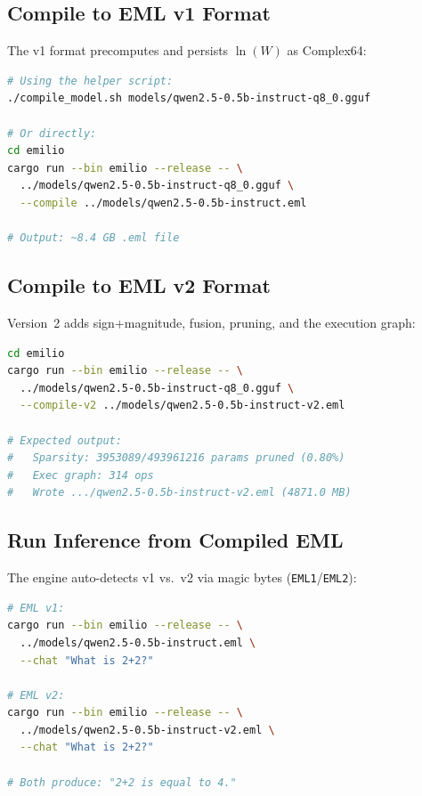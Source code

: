 \documentclass[acmsmall,nonacm]{acmart}
\begin{document}
\subsection{Compile to EML v1 Format}

The v1 format precomputes and persists $\ln(W)$ as Complex64:

\begin{lstlisting}[language=bash,caption={Compiling to EML v1.}]
# Using the helper script:
./compile_model.sh models/qwen2.5-0.5b-instruct-q8_0.gguf

# Or directly:
cd emilio
cargo run --bin emilio --release -- \
  ../models/qwen2.5-0.5b-instruct-q8_0.gguf \
  --compile ../models/qwen2.5-0.5b-instruct.eml

# Output: ~8.4 GB .eml file
\end{lstlisting}

\subsection{Compile to EML v2 Format}

Version~2 adds sign+magnitude, fusion, pruning, and the execution graph:

\begin{lstlisting}[language=bash,caption={Compiling to EML v2.}]
cd emilio
cargo run --bin emilio --release -- \
  ../models/qwen2.5-0.5b-instruct-q8_0.gguf \
  --compile-v2 ../models/qwen2.5-0.5b-instruct-v2.eml

# Expected output:
#   Sparsity: 3953089/493961216 params pruned (0.80%)
#   Exec graph: 314 ops
#   Wrote .../qwen2.5-0.5b-instruct-v2.eml (4871.0 MB)
\end{lstlisting}

\subsection{Run Inference from Compiled EML}

The engine auto-detects v1 vs.\ v2 via magic bytes (\texttt{EML1}/\texttt{EML2}):

\needspace{14\baselineskip}
\begin{lstlisting}[language=bash,caption={Inference from compiled .eml files.}]
# EML v1:
cargo run --bin emilio --release -- \
  ../models/qwen2.5-0.5b-instruct.eml \
  --chat "What is 2+2?"

# EML v2:
cargo run --bin emilio --release -- \
  ../models/qwen2.5-0.5b-instruct-v2.eml \
  --chat "What is 2+2?"

# Both produce: "2+2 is equal to 4."
\end{lstlisting}
\end{document}
